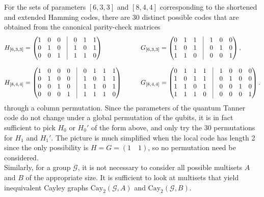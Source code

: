 \documentclass[a4paper,onecolumn,11pt]{quantumarticle}
\def\G{\mathcal{G}}
\begin{document}
For the sets of parameters $[6,3,3]$ and $[8,4,4]$ corresponding to the shortened and extended Hamming codes, there are 30 distinct possible codes that are obtained from the canonical parity-check matrices
\begin{align*}
H_{[6,3,3]} &=
\begin{pmatrix}
1 & 0 & 0 & \vline & 0 & 1 & 1 \\
0 & 1 & 0 & \vline & 1 & 0 & 1 \\
0 & 0 & 1 & \vline & 1 & 1 & 0
\end{pmatrix}
\qquad &
G_{[6,3,3]} &=
\begin{pmatrix}
0 & 1 & 1 & \vline & 1 & 0 & 0 \\
1 & 0 & 1 & \vline & 0 & 1 & 0 \\
1 & 1 & 0 & \vline & 0 & 0 & 1
\end{pmatrix},
\\[0.8em]
H_{[8,4,4]} &=
\begin{pmatrix}
1 & 0 & 0 & 0 & \vline & 0 & 1 & 1 & 1 \\
0 & 1 & 0 & 0 & \vline & 1 & 0 & 1 & 1 \\
0 & 0 & 1 & 0 & \vline & 1 & 1 & 0 & 1 \\
0 & 0 & 0 & 1 & \vline & 1 & 1 & 1 & 0
\end{pmatrix}
\qquad &
G_{[8,4,4]} &=
\begin{pmatrix}
0 & 1 & 1 & 1 & \vline & 1 & 0 & 0 & 0 \\
1 & 0 & 1 & 1 & \vline & 0 & 1 & 0 & 0 \\
1 & 1 & 0 & 1 & \vline & 0 & 0 & 1 & 0 \\
1 & 1 & 1 & 0 & \vline & 0 & 0 & 0 & 1
\end{pmatrix}.
\end{align*}
through a column permutation.
Since the parameters of the quantum Tanner code do not change under a global permutation of the qubits, it is in fact sufficient to pick $H_0$ or $H_0'$ of the form above, and only try the 30 permutations for $H_1$ and $H_1'$. The picture is much simplified when the local code has length 2 since the only possibility is $H=G = (1 \quad 1)$, so no permutation need be considered.\\

Similarly, for a group $\G$, it is not necessary to consider all possible multisets $A$ and $B$ of the appropriate size. It is sufficient to look at multisets that yield inequivalent Cayley graphs $\mathrm{Cay}_2(\G,A)$ and $\mathrm{Cay}_2(\G,B)$.\\
\end{document}

